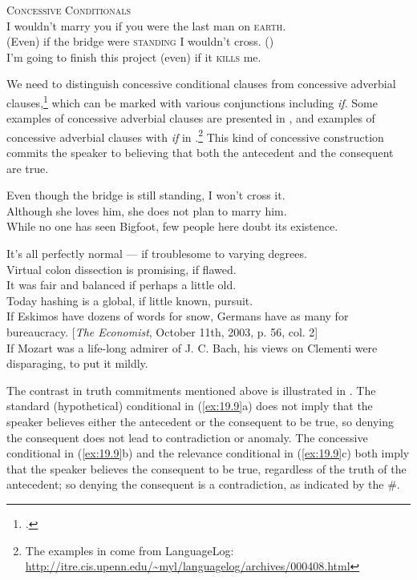 \ea \label{ex:19.6}
\textsc{Concessive Conditionals}\\
\ea  I wouldn’t marry you if you were the last man on \textsc{earth}. \\
\ex (Even) if the bridge were \textsc{standing} I wouldn’t cross. (\citealt{Bennett1982})\\
\ex I’m going to finish this project (even) if it \textsc{kills} me.
                       \z
\z


We need to distinguish concessive conditional clauses from concessive adverbial clauses,\footnote{\citet{ThompsonEtAl2007}.} which can be marked with various conjunctions including \textit{if}. Some examples of concessive adverbial clauses are presented in , and examples of concessive adverbial clauses with \textit{if} in .\footnote{The examples in  come from LanguageLog: \url{http://itre.cis.upenn.edu/~myl/languagelog/archives/000408.html}}  This kind of concessive construction commits the speaker to believing that both the antecedent and the consequent are true.


\ea \label{ex:19.7}
\ea  Even though the bridge is still standing, I won’t cross it.\\
\ex Although she loves him, she does not plan to marry him.\\
\ex While no one has seen Bigfoot, few people here doubt its existence.
                       \z
\z

\ea \label{ex:19.8}
\ea  It’s all perfectly normal — if troublesome to varying degrees.\\
\ex Virtual colon dissection is promising, if flawed.\\
\ex It was fair and balanced if perhaps a little old.\\
\ex Today hashing is a global, if little known, pursuit.\\
\ex If Eskimos have dozens of words for snow, Germans have as many for\\
  bureaucracy. [\textit{The Economist}, October 11th, 2003, p. 56, col. 2]\\
\ex If Mozart was a life-long admirer of J. C. Bach, his views on Clementi were disparaging, to put it mildly. 
                       \z
\z


The contrast in truth commitments mentioned above is illustrated in . The standard (hypothetical) conditional in (\ref{ex:19.9}a) does not imply that the speaker believes either the antecedent or the consequent to be true, so denying the consequent does not lead to contradiction or anomaly. The concessive conditional in (\ref{ex:19.9}b) and the relevance conditional in (\ref{ex:19.9}c) both imply that the speaker believes the consequent to be true, regardless of the truth of the antecedent; so denying the consequent is a contradiction, as indicated by the \#.



